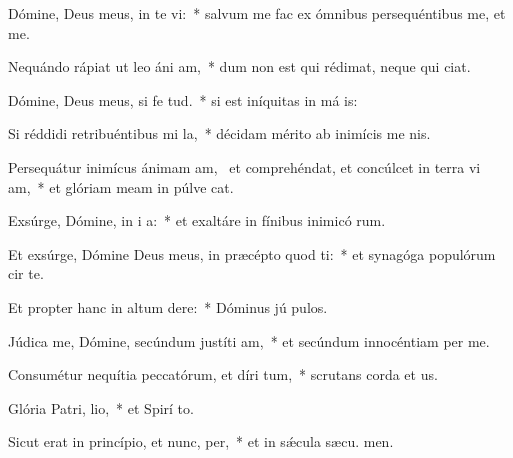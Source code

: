 \item Dómine, Deus meus, in te vi:~* salvum me fac ex ómnibus persequéntibus me, et  me.
\item Nequándo rápiat ut leo áni am,~* dum non est qui rédimat, neque qui  ciat.
\item Dómine, Deus meus, si fe tud.~* si est iníquitas in má is:
\item Si réddidi retribuéntibus mi la,~* décidam mérito ab inimícis me nis.
\item Persequátur inimícus ánimam am,~\pscross{} et comprehéndat, et concúlcet in terra vi am,~* et glóriam meam in púlve cat.
\item Exsúrge, Dómine, in i a:~* et exaltáre in fínibus inimicó rum.
\item Et exsúrge, Dómine Deus meus, in præcépto quod ti:~* et synagóga populórum cir te.
\item Et propter hanc in altum dere:~* Dóminus jú pulos.
\item Júdica me, Dómine, secúndum justíti am,~* et secúndum innocéntiam  per me.
\item Consumétur nequítia peccatórum, et díri tum,~* scrutans corda et  us.
\item Glória Patri,  lio,~* et Spirí to.
\item Sicut erat in princípio, et nunc,  per,~* et in sǽcula sæcu. men.
